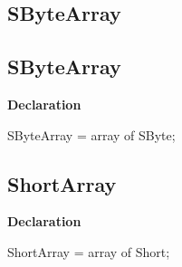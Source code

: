 \documentclass{report}
\newif\ifpdf
\begin{document}
\subsection*{\large{\textbf{SByteArray}}\normalsize\hspace{1ex}\hrulefill}
\else
\subsection*{SByteArray}
\fi
\label{NewPascal.Base-SByteArray}
\begin{list}{}{
\setlength{\itemindent}{0cm}
\setlength{\listparindent}{0cm}
\setlength{\leftmargin}{\evensidemargin}
\addtolength{\leftmargin}{\tmplength}
\settowidth{\labelsep}{X}
\addtolength{\leftmargin}{\labelsep}
\setlength{\labelwidth}{\tmplength}
}
\item[\textbf{Declaration}\hfill]
\ifpdf
\begin{flushleft}
\fi
\begin{ttfamily}
SByteArray = array of SByte;\end{ttfamily}

\ifpdf
\end{flushleft}
\fi

\end{list}
\ifpdf
\subsection*{\large{\textbf{ShortArray}}\normalsize\hspace{1ex}\hrulefill}
\else
\subsection*{ShortArray}
\fi
\label{NewPascal.Base-ShortArray}
\begin{list}{}{
\setlength{\itemindent}{0cm}
\setlength{\listparindent}{0cm}
\setlength{\leftmargin}{\evensidemargin}
\addtolength{\leftmargin}{\tmplength}
\settowidth{\labelsep}{X}
\addtolength{\leftmargin}{\labelsep}
\setlength{\labelwidth}{\tmplength}
}
\item[\textbf{Declaration}\hfill]
\ifpdf
\begin{flushleft}
\fi
\begin{ttfamily}
ShortArray = array of Short;\end{ttfamily}

\ifpdf
\end{flushleft}
\fi

\end{list}
\ifpdf
\end{document}
